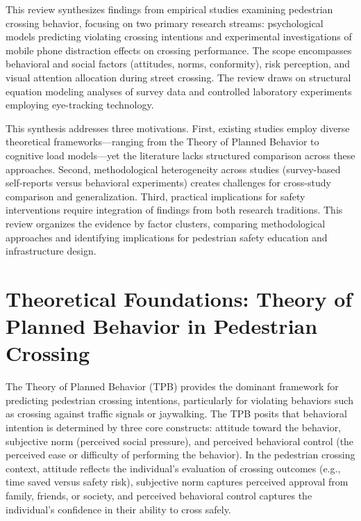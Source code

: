 \documentclass{article}
\begin{document}
This review synthesizes findings from empirical studies examining pedestrian crossing behavior, focusing on two primary research streams: psychological models predicting violating crossing intentions and experimental investigations of mobile phone distraction effects on crossing performance. The scope encompasses behavioral and social factors (attitudes, norms, conformity), risk perception, and visual attention allocation during street crossing. The review draws on structural equation modeling analyses of survey data and controlled laboratory experiments employing eye-tracking technology. \cite{09_2018_jiang_aap,08_2016_zhou_aap}

This synthesis addresses three motivations. First, existing studies employ diverse theoretical frameworks—ranging from the Theory of Planned Behavior to cognitive load models—yet the literature lacks structured comparison across these approaches. Second, methodological heterogeneity across studies (survey-based self-reports versus behavioral experiments) creates challenges for cross-study comparison and generalization. Third, practical implications for safety interventions require integration of findings from both research traditions. This review organizes the evidence by factor clusters, comparing methodological approaches and identifying implications for pedestrian safety education and infrastructure design. \cite{08_2016_zhou_aap,09_2018_jiang_aap}

\section{Theoretical Foundations: Theory of Planned Behavior in Pedestrian Crossing}
The Theory of Planned Behavior (TPB) provides the dominant framework for predicting pedestrian crossing intentions, particularly for violating behaviors such as crossing against traffic signals or jaywalking. The TPB posits that behavioral intention is determined by three core constructs: attitude toward the behavior, subjective norm (perceived social pressure), and perceived behavioral control (the perceived ease or difficulty of performing the behavior). In the pedestrian crossing context, attitude reflects the individual's evaluation of crossing outcomes (e.g., time saved versus safety risk), subjective norm captures perceived approval from family, friends, or society, and perceived behavioral control captures the individual's confidence in their ability to cross safely. \cite{08_2016_zhou_aap}
\end{document}
